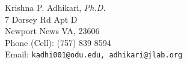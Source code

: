\documentclass[10pt, letterpaper]{article}
\newcommand{\cd}{$\cdot${ }}
\begin{document}

{\LARGE Krishna P. Adhikari, \emph{Ph.D. }} \\[.5cm]
7 Dorsey Rd Apt D \\
Newport News VA, 23606 \\
Phone (Cell): (757) 839 8594 \\
Email: \texttt{kadhi001@odu.edu, adhikari@jlab.org} \\




\end{document}
